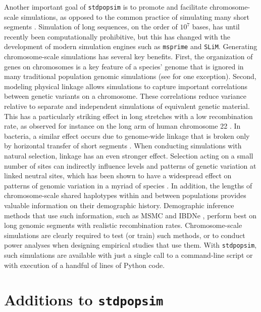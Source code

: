 \documentclass[hidelinks]{article}
\newcommand{\stdpopsim}{\texttt{stdpopsim}\xspace}
\begin{document}
Another important goal of \stdpopsim is to promote and facilitate chromosome-scale simulations,
as opposed to the common practice of simulating many short segments \citep[see, e.g.,][]{harris2016genetic}.
Simulation of long sequences, on the order of $10^7$ bases,
has until recently been computationally prohibitive,
but this has changed with the development of modern simulation engines
such as \texttt{msprime} and \texttt{SLiM}.
Generating chromosome-scale simulations has several key benefits.
First, the organization of genes on chromosomes is a key feature of a species' genome that is ignored in many traditional population genomic simulations
 (see \cite{schrider2020background} for one exception).
Second, modeling physical linkage allows simulations to capture
important correlations between genetic variants on a chromosome.
These correlations reduce variance relative to separate and independent simulations of equivalent genetic material.
This has a particularly striking effect in long stretches with a low recombination rate,
as observed for instance on the long arm of human chromosome 22 \citep{Dawson2002}.
In bacteria, a similar effect occurs due to genome-wide linkage that is broken only
by horizontal transfer of short segments \citep{Didelot2010}.
When conducting simulations with natural selection, linkage has
an even stronger effect. Selection acting on a small number of sites can
indirectly influence levels and patterns of genetic variation at linked neutral sites,
which has been shown to have a widespread
effect on patterns of genomic variation in a myriad of species
\citep[e.g.,][]{McVicker2009,Charlesworth2012}. 
In addition, the lengths of chromosome-scale shared haplotypes within and
between populations provides valuable information on their demographic history.
Demographic inference methods that use such information,
such as MSMC \citep{Schiffels2020} and IBDNe \citep{browning2015accurate},
perform best on long genomic segments with realistic recombination rates.
Chromosome-scale simulations are clearly required to test (or train) such methods,
or to conduct power analyses when designing empirical studies that use them.
With \stdpopsim, such simulations are available with just a single call to a command-line script or with execution of a handful of lines of Python code.


\section*{Additions to \stdpopsim}
    \label{sec:expanded-catalog}
\end{document}
